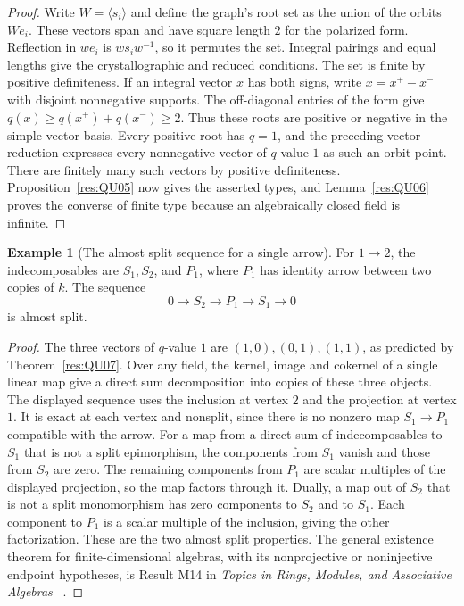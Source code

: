 \documentclass[11pt,oneside,openany]{book}
\theoremstyle{definition}
\newtheorem{example}[theorem]{Example}
\theoremstyle{remark}
\begin{document}
\begin{proof}
Write \(W=\langle s_i\rangle\) and define the graph's root set
as the union of the orbits \(W e_i\). These vectors span and
have square length \(2\) for the polarized form. Reflection in
\(w e_i\) is \(w s_i w^{-1}\), so it permutes the set. Integral
pairings and equal lengths give the crystallographic and reduced
conditions. The set is finite by positive definiteness. If an
integral vector \(x\) has both signs, write \(x=x^+-x^-\) with
disjoint nonnegative supports. The off-diagonal entries of the
form give \(q(x)\ge q(x^+)+q(x^-)\ge2\). Thus these roots are
positive or negative in the simple-vector basis. Every positive
root has \(q=1\), and the preceding vector reduction expresses
every nonnegative vector of \(q\)-value \(1\) as such an orbit point.
There are finitely many such vectors by positive definiteness.
Proposition~\ref{res:QU05} now gives the asserted types, and
Lemma~\ref{res:QU06} proves the converse of finite type because
an algebraically closed field is infinite.
\end{proof}

\begin{example}[The almost split sequence for a single arrow]
\label{res:QU08}
For \(1\to2\), the indecomposables are \(S_1,S_2\), and \(P_1\),
where \(P_1\) has identity arrow between two copies of \(k\).
The sequence
\[
 0\longrightarrow S_2\longrightarrow P_1
   \longrightarrow S_1\longrightarrow0
\]
is almost split.
\end{example}
\begin{proof}
The three vectors of \(q\)-value \(1\) are \((1,0),(0,1),(1,1)\),
as predicted by Theorem~\ref{res:QU07}. Over any field, the kernel,
image and cokernel of a single linear map give a direct sum
decomposition into copies of these three objects. The displayed sequence uses the
inclusion at vertex \(2\) and the projection at vertex \(1\).
It is exact at each vertex and nonsplit, since there is no
nonzero map \(S_1\to P_1\) compatible with the arrow.
For a map from a direct sum of indecomposables to \(S_1\) that is
not a split epimorphism, the components from \(S_1\) vanish
and those from \(S_2\) are zero. The remaining components
from \(P_1\) are scalar multiples of the displayed projection,
so the map factors through it. Dually, a map out of \(S_2\)
that is not a split monomorphism has zero components to \(S_2\)
and to \(S_1\). Each component to \(P_1\) is a scalar
multiple of the inclusion, giving the other factorization.
These are the two almost split properties. The general existence
theorem for finite-dimensional algebras, with its nonprojective
or noninjective endpoint hypotheses, is Result M14 in
\emph{Topics in Rings, Modules, and Associative Algebras}
~\cite[PDF p.~19]{mg-rm03d}.
\end{proof}
\end{document}
